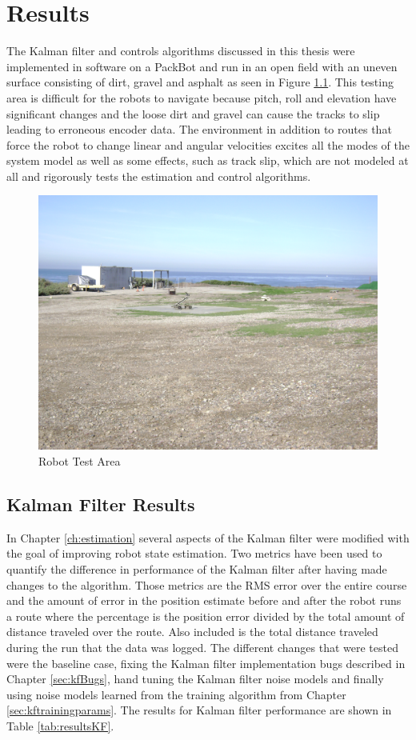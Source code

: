 \chapter{Results}
\label{ch:results}
The Kalman filter and controls algorithms discussed in this thesis were implemented in software on a PackBot and run in an open field with an uneven surface consisting of dirt, gravel and asphalt as seen in Figure \ref{fig:resultsTestArea}. This testing area is difficult for the robots to navigate because pitch, roll and elevation have significant changes and the loose dirt and gravel can cause the tracks to slip leading to erroneous encoder data. The environment in addition to routes that force the robot to change linear and angular velocities excites all the modes of the system model as well as some effects, such as track slip, which are not modeled at all and rigorously tests the estimation and control algorithms.

\begin{figure}[ht!]
	\centering
	\includegraphics[width=.75\textwidth]{images/flightFieldTestArea}
	\caption{Robot Test Area}
	\label{fig:resultsTestArea}
\end{figure}

\section{Kalman Filter Results}
\label{sec:kfResults}
In Chapter \ref{ch:estimation} several aspects of the Kalman filter were modified with the goal of improving robot state estimation. Two metrics have been used to quantify the difference in performance of the Kalman filter after having made changes to the algorithm. Those metrics are the RMS error over the entire course and the amount of error in the position estimate before and after the robot runs a route where the percentage is the position error divided by the total amount of distance traveled over the route. Also included is the total distance traveled during the run that the data was logged. The different changes that were tested were the baseline case, fixing the Kalman filter implementation bugs described in Chapter \ref{sec:kfBugs}, hand tuning the Kalman filter noise models and finally using noise models learned from the training algorithm from Chapter \ref{sec:kftrainingparams}. The results for Kalman filter performance are shown in Table \ref{tab:resultsKF}.

